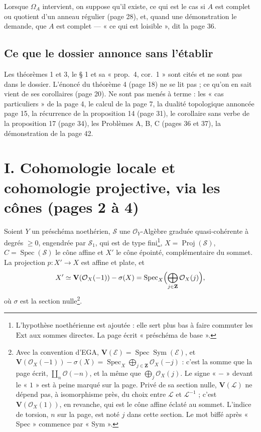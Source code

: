 \documentclass[11pt,a4paper]{article}
\begin{document}
Lorsque $\Omega_A$ intervient, on suppose qu'il existe, ce qui est le cas si
$A$ est complet ou quotient d'un anneau régulier (page 28), et, quand une
démonstration le demande, que $A$ est complet --- « ce qui est loisible »,
dit la page 36.

\subsection*{Ce que le dossier annonce sans l'établir}

Les théorèmes 1 et 3, le § 1 et sa « prop.\ 4, cor.\ 1 » sont cités et ne sont
pas dans le dossier. L'énoncé du théorème 4 (page 18) ne se lit pas ; ce qu'on
en sait vient de ses corollaires (page 20). Ne sont pas menés à terme : les
« cas particuliers » de la page 4, le calcul de la page 7, la dualité
topologique annoncée page 15, la récurrence de la proposition 14 (page 31),
le corollaire sans verbe de la proposition 17 (page 34), les Problèmes A, B, C
(pages 36 et 37), la démonstration de la page 42.

\section*{I. Cohomologie locale et cohomologie projective, via les cônes (pages 2 à 4)}

Soient $Y$ un préschéma noethérien, $\mathcal{S}$ une $\mathcal{O}_Y$-Algèbre
graduée quasi-cohérente à degrés $\geqslant 0$, engendrée par $\mathcal{S}_1$,
qui est de type fini\footnote{L'hypothèse noethérienne est ajoutée : elle sert
plus bas à faire commuter les $\mathrm{Ext}$ aux sommes directes. La page
écrit « préschéma de base ».}, $X = \operatorname{Proj}(\mathcal{S})$,
$C = \operatorname{Spec}(\mathcal{S})$ le cône affine et $X'$ le cône épointé,
complémentaire du sommet. La projection $p : X' \to X$ est affine et plate, et
\[
  X' \simeq \mathbf{V}(\mathcal{O}_X(-1)) - \sigma(X)
  = \operatorname{Spec}_X\Bigl(\bigoplus_{j \in \mathbf{Z}} \mathcal{O}_X(j)\Bigr),
\]
où $\sigma$ est la section nulle\footnote{Avec la convention d'EGA,
$\mathbf{V}(\mathcal{E}) = \operatorname{Spec} \operatorname{Sym}(\mathcal{E})$,
et $\mathbf{V}(\mathcal{O}_X(-1)) - \sigma(X) = \operatorname{Spec}_X
\bigoplus_{j \in \mathbf{Z}} \mathcal{O}_X(-j)$ : c'est la somme que la page
écrit, $\coprod_n \mathcal{O}(-n)$, et la même que $\bigoplus_j
\mathcal{O}_X(j)$. Le signe « $-$ » devant le « $1$ » est à peine marqué sur la
page. Privé de sa section nulle, $\mathbf{V}(\mathcal{L})$ ne dépend pas, à
isomorphisme près, du choix entre $\mathcal{L}$ et $\mathcal{L}^{-1}$ ; c'est
$\mathbf{V}(\mathcal{O}_X(1))$, en revanche, qui est le cône affine éclaté au
sommet. L'indice de torsion, $n$ sur la page, est noté $j$ dans cette section.
Le mot biffé après « Spec » commence par « Sym ».}.
\end{document}
